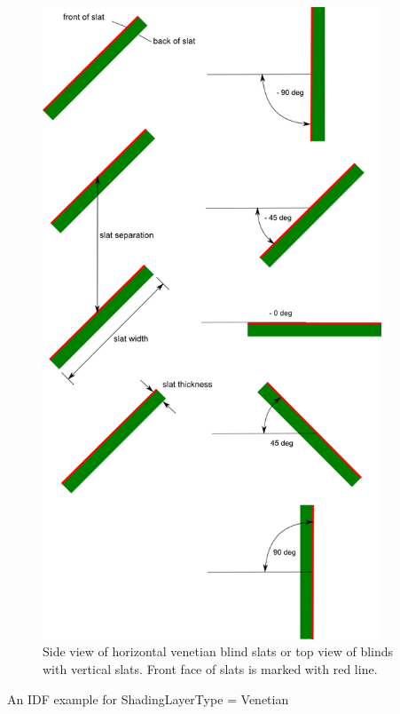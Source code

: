 \begin{figure}[hbtp] %
\centering
\includegraphics[width=0.9\textwidth, height=0.9\textheight, keepaspectratio=true]{media/image042.png}
\caption{Side view of horizontal venetian blind slats or top view of blinds with vertical slats.  Front face of slats is marked with red line. \protect \label{fig:side-view-of-horizontal-venetian-blind-slats}}
\end{figure}

An IDF example for ShadingLayerType = Venetian

